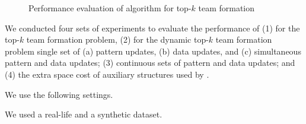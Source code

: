 \begin{figure}[tb!]
\begin{center}
\hspace{0.2ex}
\vspace{-2.0ex}
\end{center}

\vspace{-3ex}
\caption{Performance evaluation of algorithm \optgrouprec for top-$k$ team formation}
\label{exp-semantic-effectiveness-citation}
\vspace{-3.0ex}
\end{figure}

We conducted four sets of experiments to evaluate the performance of
(1) \optgrouprec for the top-$k$ team formation problem,
(2) \inc for the dynamic top-$k$ team formation problem
\wrt single set of (a) pattern updates, (b) data updates, and (c) simultaneous pattern and data updates;
(3) \inc \wrt continuous sets of pattern and data updates; and
(4) the extra space cost of auxiliary structures used by \inc.


 We use the following settings.

 We used a real-life and a synthetic dataset.

